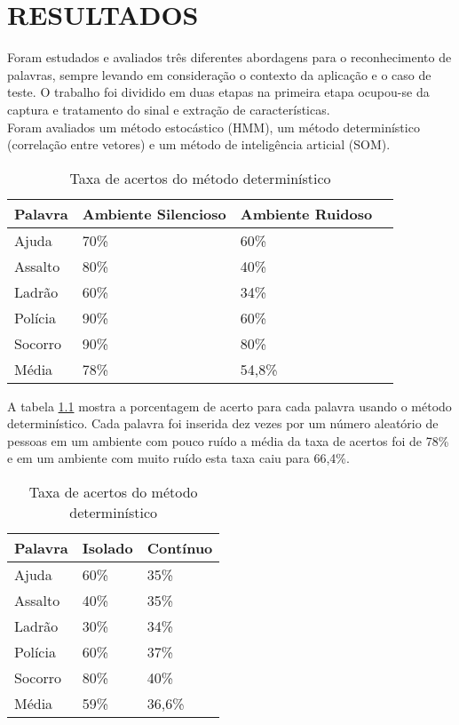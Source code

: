 \chapter{RESULTADOS}
\thispagestyle{plain}
\label{chap:anal}

\quad Foram estudados e avaliados três diferentes abordagens para o reconhecimento de palavras, sempre levando em consideração o contexto da aplicação e o caso de teste. 
O trabalho foi dividido em duas etapas na primeira etapa ocupou-se da captura e tratamento do sinal e extração de características.\\ 
\quad Foram avaliados um método estocástico (HMM), um método determinístico (correlação entre vetores) e um método de inteligência articial (SOM). 
\begin{table}[H]
\centering
\caption{Taxa de acertos do método determinístico}
\label{tab:comp}
\smallskip
\begin{tabular}{|l|l|l|l|}
\hline
 Palavra & Ambiente Silencioso & Ambiente Ruidoso\\[0.5ex]
\hline

Ajuda & 70\% &  60\%\\[0.5ex]
\hline

Assalto & 80\% &  40\% \\[0.5ex]
\hline

Ladrão & 60\% & 34\% \\[0.5ex]
\hline

Polícia & 90\% & 60\%\\[0.5ex]
\hline

Socorro & 90\% & 80\%\\[0.5ex]
\hline

Média & 78\% & 54,8\% \\[0.5ex]
\hline
\end{tabular}
\end{table}

A tabela \ref{tab:comp} mostra a porcentagem de acerto para cada palavra usando o método determinístico. Cada palavra foi inserida dez vezes por um número aleatório de pessoas  em um ambiente com pouco ruído a média da taxa de acertos foi de 78\% e em um ambiente com muito ruído esta taxa caiu para 66,4\%.

\begin{table}[H]
\centering
\caption{Taxa de acertos do método determinístico}
\label{tab:comp2}
\smallskip
\begin{tabular}{|l|l|l|}
\hline
 Palavra & Isolado & Contínuo \\
\hline

Ajuda & 60\% &  35\% \\
\hline

Assalto & 40\% &  35\% \\
\hline

Ladrão & 30\% & 34\%\\
\hline

Polícia & 60\% & 37\% \\
\hline
Socorro & 80\% & 40\%\\
\hline

Média & 59\% & 36,6\% \\
\hline
\end{tabular}
\end{table}


